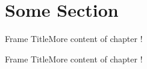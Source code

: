 \section{Some Section}

\begin{frame}{Frame Title}More content of chapter \ChapterNumber!\end{frame}
\begin{frame}{Frame Title}More content of chapter \ChapterNumber!\end{frame}
